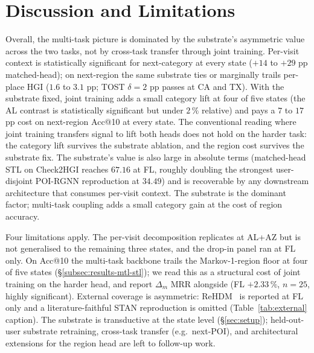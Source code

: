 \section{Discussion and Limitations}
\label{sec:discussion}

Overall, the multi-task picture is dominated by the substrate's asymmetric value across the two tasks, not by cross-task transfer through joint training. Per-visit context is statistically significant for next-category at every state ($+14$ to $+29$ pp matched-head); on next-region the same substrate ties or marginally trails per-place HGI ($1.6$ to $3.1$ pp; TOST $\delta=2$ pp passes at CA and TX). With the substrate fixed, joint training adds a small category lift at four of five states (the AL contrast is statistically significant but under $2\,\%$ relative) and pays a $7$ to $17$ pp cost on next-region Acc@10 at every state. The conventional reading where joint training transfers signal to lift both heads does not hold on the harder task: the category lift survives the substrate ablation, and the region cost survives the substrate fix. The substrate's value is also large in absolute terms (matched-head STL on Check2HGI reaches $67.16$ at FL, roughly doubling the strongest user-disjoint POI-RGNN reproduction at $34.49$) and is recoverable by any downstream architecture that consumes per-visit context. The substrate is the dominant factor; multi-task coupling adds a small category gain at the cost of region accuracy.

Four limitations apply. The per-visit decomposition replicates at AL+AZ but is not generalised to the remaining three states, and the drop-in panel ran at FL only. On Acc@10 the multi-task backbone trails the Markov-1-region floor at four of five states (\S\ref{subsec:results-mtl-stl}); we read this as a structural cost of joint training on the harder head, and report $\Delta_m$ MRR alongside (FL $+2.33\,\%$, $n=25$, highly significant). External coverage is asymmetric: ReHDM~\cite{li2025rehdm} is reported at FL only and a literature-faithful STAN reproduction is omitted (Table~\ref{tab:external} caption). The substrate is transductive at the state level (\S\ref{sec:setup}); held-out-user substrate retraining, cross-task transfer (e.g.\ next-POI), and architectural extensions for the region head are left to follow-up work.

